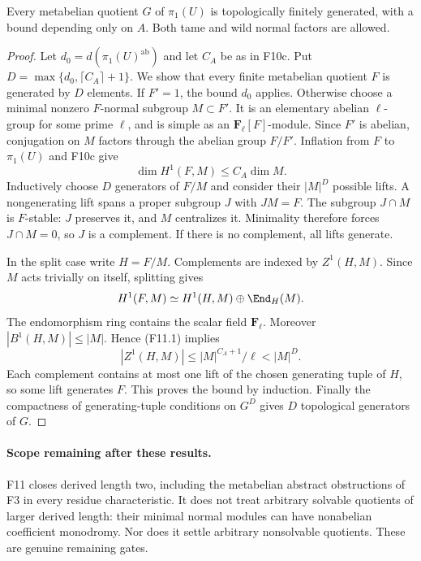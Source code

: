 \begin{theorem}
Every metabelian quotient $G$ of $\pi_1(U)$ is topologically
finitely generated, with a bound depending only on $A$.
Both tame and wild normal factors are allowed.
\end{theorem}
\begin{proof}
Let $d_0=d(\pi_1(U)^{\mathrm{ab}})$ and let $C_A$ be as in
F10c. Put $D=\max\{d_0,\lceil C_A\rceil+1\}$.
We show that every finite metabelian quotient $F$ is generated
by $D$ elements. If $F'=1$, the bound $d_0$ applies. Otherwise
choose a minimal nonzero $F$-normal subgroup $M\subset F'$.
It is an elementary abelian $\ell$-group for some prime $\ell$,
and is simple as an $\mathbf F_\ell[F]$-module. Since $F'$ is
abelian, conjugation on $M$ factors through the abelian group
$F/F'$. Inflation from $F$ to $\pi_1(U)$ and F10c give
\[
                  \dim H^1(F,M)\leq C_A\dim M.
 \tag{F11.1}
\]
Inductively choose $D$ generators of $F/M$ and consider their
$|M|^D$ possible lifts. A nongenerating lift spans a proper
subgroup $J$ with $JM=F$. The subgroup $J\cap M$ is $F$-stable:
$J$ preserves it, and $M$ centralizes it. Minimality therefore
forces $J\cap M=0$, so $J$ is a complement. If there is no
complement, all lifts generate.

In the split case write $H=F/M$. Complements are indexed by
$Z^1(H,M)$. Since $M$ acts trivially on itself, splitting gives
\[
 H^1(F,M)\simeq H^1(H,M)\oplus\End_H(M).
\]
The endomorphism ring contains the scalar field $\mathbf F_\ell$.
Moreover $|B^1(H,M)|\leq|M|$. Hence (F11.1) implies
\[
 |Z^1(H,M)|\leq |M|^{C_A+1}/\ell<|M|^D.
\]
Each complement contains at most one lift of the chosen generating
tuple of $H$, so some lift generates $F$. This proves the bound
by induction. Finally the compactness of generating-tuple conditions
on $G^D$ gives $D$ topological generators of $G$.
\end{proof}

\paragraph{Scope remaining after these results.}
F11 closes derived length two, including the metabelian
abstract obstructions of F3 in every residue characteristic.
It does not treat arbitrary solvable quotients of larger derived
length: their minimal normal modules can have nonabelian
coefficient monodromy. Nor does it settle arbitrary nonsolvable
quotients. These are genuine remaining gates.
